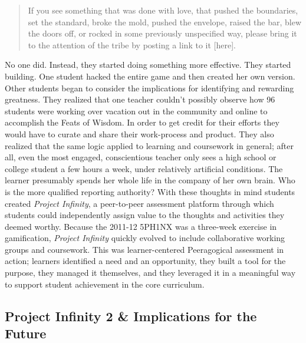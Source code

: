 \begin{quote}
If you see something that was done with love, that pushed the
boundaries, set the standard, broke the mold, pushed the envelope,
raised the bar, blew the doors off, or rocked in some previously
unspecified way, please bring it to the attention of the tribe by
posting a link to it {{[}here{]}}.
\end{quote}

No one did. Instead, they started doing something more effective. They
started building. One student hacked the entire game and then created
her own version. Other students began to consider the implications for
identifying and rewarding greatness. They realized that one teacher
couldn't possibly observe how 96 students were working over vacation out
in the community and online to accomplish the Feats of Wisdom. In order
to get credit for their efforts they would have to curate and share
their work-process and product. They also realized that the same logic
applied to learning and coursework in general; after all, even the most
engaged, conscientious teacher only sees a high school or college
student a few hours a week, under relatively artificial conditions. The
learner presumably spends her whole life in the company of her own
brain. Who is the more qualified reporting authority? With these
thoughts in mind students created \emph{Project Infinity}, a
peer-to-peer assessment platform through which students could
independently assign value to the thoughts and activities they deemed
worthy. Because the 2011-12 5PH1NX was a three-week exercise in
gamification, \emph{Project Infinity} quickly evolved to include
collaborative working groups and coursework. This was learner-centered
Peeragogical assessment in action; learners identified a need and an
opportunity, they built a tool for the purpose, they managed it
themselves, and they leveraged it in a meaningful way to support student
achievement in the core curriculum.

\subsection{Project Infinity 2 \& Implications for the
Future}\label{project-infinity-2-implications-for-the-future}

